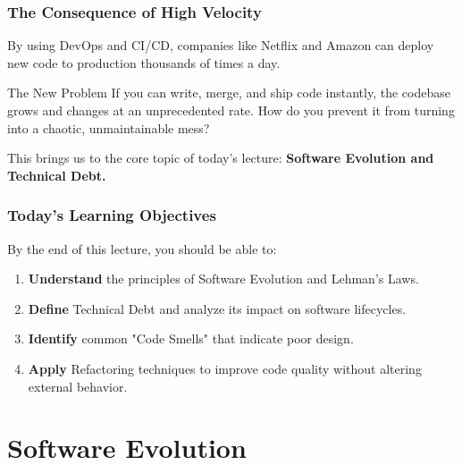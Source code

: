\documentclass[xcolor=table]{beamer}
\begin{document}
\begin{frame}
    \frametitle{The Consequence of High Velocity}
    By using DevOps and CI/CD, companies like Netflix and Amazon can deploy new code to production thousands of times a day.
    
    \vspace{0.4cm}
    \begin{alertblock}{The New Problem}
        If you can write, merge, and ship code instantly, the codebase grows and changes at an unprecedented rate. How do you prevent it from turning into a chaotic, unmaintainable mess?
    \end{alertblock}
    
    \vspace{0.4cm}
    This brings us to the core topic of today's lecture: \textbf{Software Evolution and Technical Debt.}
\end{frame}


\begin{frame}
    \frametitle{Today's Learning Objectives}
    By the end of this lecture, you should be able to:
    \begin{enumerate}
        \item \textbf{Understand} the principles of Software Evolution and Lehman's Laws.
        \item \textbf{Define} Technical Debt and analyze its impact on software lifecycles.
        \item \textbf{Identify} common "Code Smells" that indicate poor design.
        \item \textbf{Apply} Refactoring techniques to improve code quality without altering external behavior.
    \end{enumerate}
\end{frame}

\section{Software Evolution}
\end{document}
